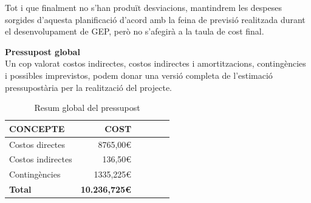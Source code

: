 Tot i que finalment no s'han produït desviacions, mantindrem les despeses sorgides d'aquesta planificació d'acord amb la feina de previsió realitzada durant el desenvolupament de GEP, però no s'afegirà a la taula de cost final.\\

\begin{table}[htb]
\centering
\label{PressupostImprevistos}
\caption{Imprevistos}
\end{table}

\noindent \textbf{\large Pressupost global}\\

\noindent Un cop valorat costos indirectes, costos indirectes i amortitzacions, contingències i possibles imprevistos, podem donar una versió completa de l’estimació pressupostària per la realització del projecte.

\begin{table}[htb]
\centering
\label{PressupostGlobal}
\begin{tabular}{lrrrrr}
\hline \textbf{CONCEPTE}                           &  \textbf{COST} \\
\hline
Costos directes                         & 8765,00\euro \\
Costos indirectes                         & 136,50\euro \\
Contingències                        & 1335,225\euro \\
\hline
\textbf{Total}    &     \textbf{10.236,725\euro}       \\
\hline                      
\end{tabular}%
\caption{Resum global del pressupost}
\end{table}

